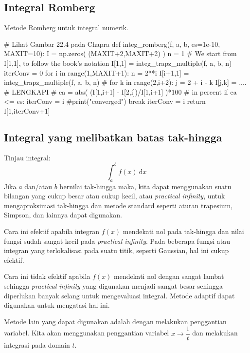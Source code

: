\subsection*{Integral Romberg}
Metode Romberg untuk integral numerik.
\begin{fullwidth}
\begin{pythoncode}
# Lihat Gambar 22.4 pada Chapra
def integ_romberg(f, a, b, es=1e-10, MAXIT=10):
    I = np.zeros( (MAXIT+2,MAXIT+2) )
    n = 1
    # We start from I[1,1], to follow the book's notation
    I[1,1] = integ_trapz_multiple(f, a, b, n)
    iterConv = 0
    for i in range(1,MAXIT+1):
        n = 2**i
        I[i+1,1] = integ_trapz_multiple(f, a, b, n)
        #
        for k in range(2,i+2):
            j = 2 + i - k
            I[j,k] = .... # LENGKAPI
        #
        ea = abs( (I[1,i+1] - I[2,i])/I[1,i+1] )*100 # in percent
        if ea <= es:
            iterConv = i
            #print("converged")
            break
        iterConv = i
    return I[1,iterConv+1]
\end{pythoncode}
\end{fullwidth}


\subsection*{Integral yang melibatkan batas tak-hingga}
Tinjau integral:
\begin{equation}
\int_{a}^{b} f(x)\ \mathrm{d}x
\label{eq:orig_integ}
\end{equation}
Jika $a$ dan/atau $b$ bernilai tak-hingga maka, kita dapat menggunakan suatu bilangan
yang cukup besar atau cukup kecil, atau \textit{practical infinity},
untuk mengaproksimasi tak-hingga dan metode
standard seperti aturan trapesium, Simpson, dan lainnya dapat digunakan.

Cara ini efektif apabila integran $f(x)$ mendekati nol pada tak-hingga dan nilai fungsi
sudah sangat kecil pada \textit{practical infinity}.
Pada beberapa fungsi atau integran yang terlokalisasi pada suatu titik, seperti Gaussian,
hal ini cukup efektif.

Cara ini tidak efektif apabila $f(x)$ mendekati nol dengan sangat lambat sehingga
\textit{practical infinity} yang digunakan menjadi sangat besar sehingga diperlukan
banyak selang untuk mengevaluasi integral. Metode adaptif dapat digunakan untuk
mengatasi hal ini.

Metode lain yang dapat digunakan adalah dengan melakukan penggantian variabel.
Kita akan menggunakan penggantian variabel $x \rightarrow \dfrac{1}{t}$ dan melakukan
integrasi pada domain $t$.

